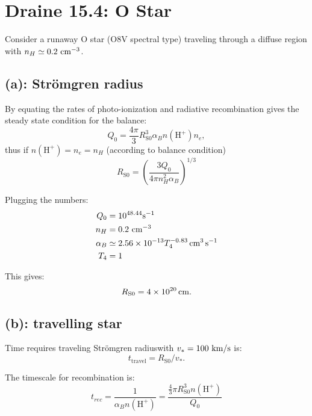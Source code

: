 \documentclass[12pt,letterpaper]{article}
\newcommand{\cm}{\textrm{\,cm}}
\newcommand{\kms}{\textrm{\,km/s}}
\newcommand{\sradius}{R_{\textrm{S0}}}
\newcommand{\hdensity}{n(\textrm{H}^{+})}
\newcommand{\second}{\textrm{s}}
\newcommand{\Stroradius}{Str\"omgren radius}
\begin{document}
\section*{Draine 15.4: O Star}

Consider a runaway O star (O8V spectral type) traveling through a diffuse region with $n_{H} \simeq 0.2\,\cm^{-3}$.

\subsection*{(a): Str\"omgren radius}

By equating the rates of photo-ionization and radiative recombination gives the steady state condition for the balance:
\begin{equation}
    Q_0 = \frac{4 \pi}{3} \sradius^3 \alpha_B \hdensity n_e,
\end{equation}
thus if $\hdensity = n_e = n_H$ (according to balance condition)
\begin{equation}
    \sradius = \left(
        \frac{3 Q_0}{4 \pi n_H^2 \alpha_B} 
        \right)^{1/3}
\end{equation}

Plugging the numbers:
\begin{equation}
    \begin{split}
        Q_0 &= 10^{48.44} \second^{-1} \\
        n_H &= 0.2 \, \cm^{-3} \\
        \alpha_B &\simeq 2.56 \times 10^{-13} T_4^{-0.83} \cm^3 \, \second^{-1} \\
        T_4 &= 1  
    \end{split}
\end{equation}

This gives:
\begin{equation}
    \sradius = 4 \times 10^{20} \cm.
\end{equation}

\subsection*{(b): travelling star}

Time requires traveling \Stroradius with $v_{*} = 100\, \kms$ is:
\begin{equation}
    t_{\textrm{travel}} = \sradius / v_{*}.
\end{equation}

The timescale for recombination is:
\begin{equation}
    t_{rec} = \frac{1}{\alpha_B \hdensity} 
    = \frac{\frac{4}{3} \pi \sradius^3 \hdensity}{Q_0}
\end{equation}
\end{document}
